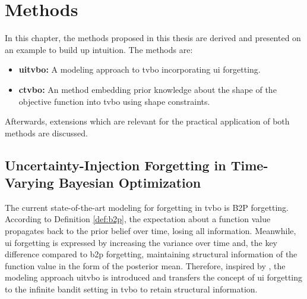 \chapter{Methods}
\label{chap:concept}

In this chapter, the methods proposed in this thesis are derived and presented on an example to build up intuition. The methods are:
\begin{itemize}
    \item \textbf{\gls{uitvbo}:} A modeling approach to \gls{tvbo} incorporating \gls{ui} forgetting.
    \item \textbf{\gls{ctvbo}:} An method embedding prior knowledge about the shape of the objective function into \gls{tvbo} using shape constraints.
\end{itemize}
Afterwards, extensions which are relevant for the practical application of both methods are discussed.

\section{Uncertainty-Injection Forgetting in Time-Varying Bayesian Optimization}
\label{sec:forgetting_strategies}

The current state-of-the-art modeling for forgetting in \gls{tvbo} is B2P forgetting. According to Definition \ref{def:b2p}, the expectation about a function value propagates back to the prior belief over time, losing all information. Meanwhile, \gls{ui} forgetting is expressed by increasing the variance over time and, the key difference compared to \gls{b2p} forgetting, maintaining structural information of the function value in the form of the posterior mean. Therefore, inspired by \textcite{Slivkins_2008}, the modeling approach \gls{uitvbo} is introduced and transfers the concept of \gls{ui} forgetting to the infinite bandit setting in \gls{tvbo} to retain structural information.

